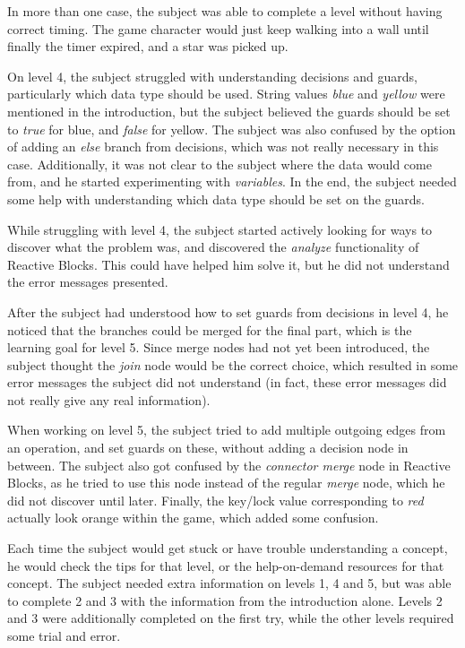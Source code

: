 \noindent
In more than one case, the subject was able to complete a level without having correct timing. The game character would just keep walking into a wall until finally the timer expired, and a star was picked up.

\noindent
On level 4, the subject struggled with understanding decisions and guards, particularly which data type should be used. String values \emph{blue} and \emph{yellow} were mentioned in the introduction, but the subject believed the guards should be set to \emph{true} for blue, and \emph{false} for yellow. The subject was also confused by the option of adding an \emph{else} branch from decisions, which was not really necessary in this case. Additionally, it was not clear to the subject where the data would come from, and he started experimenting with \emph{variables}. In the end, the subject needed some help with understanding which data type should be set on the guards.

\noindent
While struggling with level 4, the subject started actively looking for ways to discover what the problem was, and discovered the \emph{analyze} functionality of Reactive Blocks. This could have helped him solve it, but he did not understand the error messages presented.

\noindent
After the subject had understood how to set guards from decisions in level 4, he noticed that the branches could be merged for the final part, which is the learning goal for level 5. Since merge nodes had not yet been introduced, the subject thought the \emph{join} node would be the correct choice, which resulted in some error messages the subject did not understand (in fact, these error messages did not really give any real information).

\noindent
When working on level 5, the subject tried to add multiple outgoing edges from an operation, and set guards on these, without adding a decision node in between. The subject also got confused by the \emph{connector merge} node in Reactive Blocks, as he tried to use this node instead of the regular \emph{merge} node, which he did not discover until later. Finally, the key/lock value corresponding to \emph{red} actually look orange within the game, which added some confusion.

\noindent
Each time the subject would get stuck or have trouble understanding a concept, he would check the tips for that level, or the help-on-demand resources for that concept. The subject needed extra information on levels 1, 4 and 5, but was able to complete 2 and 3 with the information from the introduction alone. Levels 2 and 3 were additionally completed on the first try, while the other levels required some trial and error.

